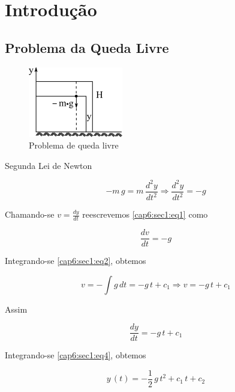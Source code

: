 \section{Introdução}

\subsection{Problema da Queda Livre}

\begin{figure}[htb]
 \centering
 \includegraphics[scale=1.0]{capitulos/capitulo6/figuras/intro1.png}
 \caption{Problema de queda livre}
 \label{fig:intro1}
\end{figure}

Segunda Lei de Newton

\begin{equation}
 \label{cap6:sec1:eq1}
 -m \, g = m \, \frac{d^2y}{dt^2} \Rightarrow \frac{d^2y}{dt^2} = -g
\end{equation}

Chamando-se $ v = \displaystyle \frac{dy}{dt} $ reescrevemos \ref{cap6:sec1:eq1} como

\begin{equation}
 \label{cap6:sec1:eq2}
 \frac{dv}{dt} = -g
\end{equation}

Integrando-se \ref{cap6:sec1:eq2}, obtemos

\begin{equation}
 \label{cap6:sec1:eq3}
 v = -\int g \, dt = -g \, t + c_1 \Rightarrow v = -g \, t + c_1
\end{equation}

Assim

\begin{equation}
 \label{cap6:sec1:eq4}
 \frac{dy}{dt} = -g \, t + c_1
\end{equation}

Integrando-se \ref{cap6:sec1:eq4}, obtemos

\begin{equation}
 \label{cap6:sec1:eq5}
 y \, (t) = -\frac{1}{2} \, g \, t^2 + c_1 \, t + c_2
\end{equation}

